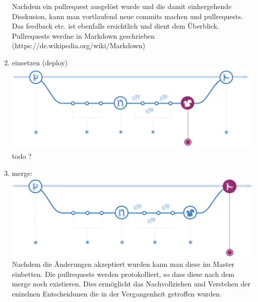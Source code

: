 \documentclass[a4paper, 8pt]{extarticle}
\begin{document}
\begin{multicols*}{3}
\begin{enumerate}
                            Nachdem ein pullrequest ausgelöst wurde und die damit einhergehende Disskusion, kann man 
                            vortlaufend neue commits machen und pullrequests. Das feedback etc. ist ebenfalls ersichtlich 
                            und dient dem Überblick. Pullrequests werdne in Markdown geschrieben (https://de.wikipedia.org/wiki/Markdown)
                    \item   einsetzen (deploy)\\
                                \includegraphics[width=1\linewidth, left]{img/git_workflow_deploy.PNG}\\
                            todo ?
                    \item   merge:\\
                                \includegraphics[width=1\linewidth, left]{img/git_workflow_merge.PNG}\\
                            Nachdem die Änderungen akzeptiert wurden kann man diese im Master einbetten.
                            Die pullrequests werden protokolliert, so dass diese nach dem merge noch existieren.
                            Dies ermöglicht das Nachvollziehen und Verstehen der enizelnen Entscheidunen die in der 
                            Vergangenheit getroffen wurden. 

                 \end{enumerate}

    \end{multicols*}
\end{document}
